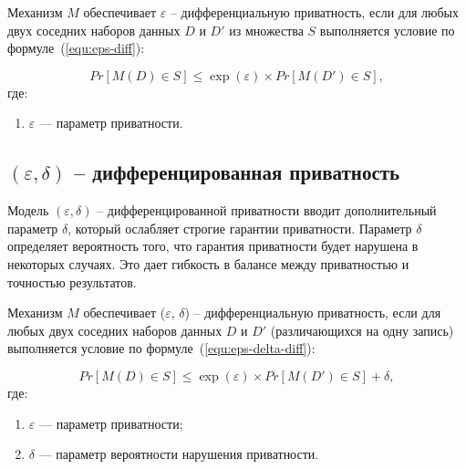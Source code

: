 Механизм $M$ обеспечивает $\varepsilon$ -- дифференциальную приватность, если для любых двух соседних наборов данных $D$ и $D'$ из множества $S$ выполняется условие по формуле~(\ref{equ:eps-diff}):

\begin{equation}\label{equ:eps-diff}
	Pr[M(D) \in S] \leqslant \exp(\varepsilon) \times Pr[M(D') \in S],
\end{equation}
где:
\begin{enumerate}[label*=---]
	\item $\varepsilon$ --- параметр приватности.
\end{enumerate}



\subsection{$(\varepsilon, \delta)$ -- дифференцированная приватность}

Модель $(\varepsilon, \delta)$ -- дифференцированной приватности вводит дополнительный параметр $\delta$, который ослабляет строгие гарантии приватности.
Параметр $\delta$ определяет вероятность того, что гарантия приватности будет нарушена в некоторых случаях.
Это дает гибкость в балансе между приватностью и точностью результатов.~\cite{hu2015differential}

\newpage
Механизм $M$ обеспечивает ($\varepsilon$, $\delta$) -- дифференциальную приватность, если для любых двух соседних наборов данных $D$ и $D'$ (различающихся на одну запись) выполняется условие по формуле~(\ref{equ:eps-delta-diff}):

\begin{equation}\label{equ:eps-delta-diff}
	Pr[M(D) \in S] \leqslant \exp(\varepsilon) \times Pr[M(D') \in S] + \delta,
\end{equation}
где:
\begin{enumerate}[label*=---]
	\item $\varepsilon$ --- параметр приватности;
	\item $\delta$ --- параметр вероятности нарушения приватности.
\end{enumerate}




